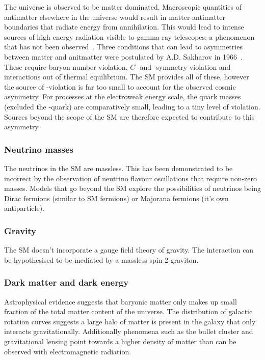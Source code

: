 The universe is observed to be matter dominated. Macroscopic quantities of antimatter elsewhere in the universe would result in matter-antimatter boundaries that radiate energy from annihilation. This would lead to intense sources of high energy radiation visible to gamma ray telescopes; a phenomenon that has not been observed~\cite{vonBallmoos2014}. 
Three conditions that can lead to asymmetries between matter and anitmatter were postulated by A.D. Sakharov in 1966~\cite{Sakharov:1967dj}. These require baryon number violation, $C$- and \CP-symmetry violation and interactions out of thermal equilibrium. The SM provides all of these, however the source of \CP-violation is far too small to account for the observed cosmic asymmetry. For processes at the electroweak energy scale, the quark masses (excluded the \tquark-quark) are comparatively small, leading to a tiny level of \CP violation. Sources beyond the scope of the SM are therefore expected to contribute to this asymmetry. 

\subsubsection{Neutrino masses} 
The neutrinos in the SM are massless. This has been demonstrated to be incorrect by the observation of neutrino flavour oscillations that require non-zero masses. Models that go beyond the SM explore the possibilities of neutrinos being Dirac fermions (similar to SM fermions) or Majorana fermions (it's own antiparticle). 

\subsubsection{Gravity}
The SM doesn't incorporate a gauge field theory of gravity. The interaction can be hypothesised to be mediated by a massless spin-2 graviton. 

\subsubsection{Dark matter and dark energy}
Astrophysical evidence suggests that baryonic matter only makes up small fraction of the total matter content of the universe. 
The distribution of galactic rotation curves suggests a large halo of matter is present in the galaxy that only interacts gravitationally. Additionally phenomena such as the bullet cluster and gravitational lensing point towards a higher density of matter than can be observed with electromagnetic radiation. 

